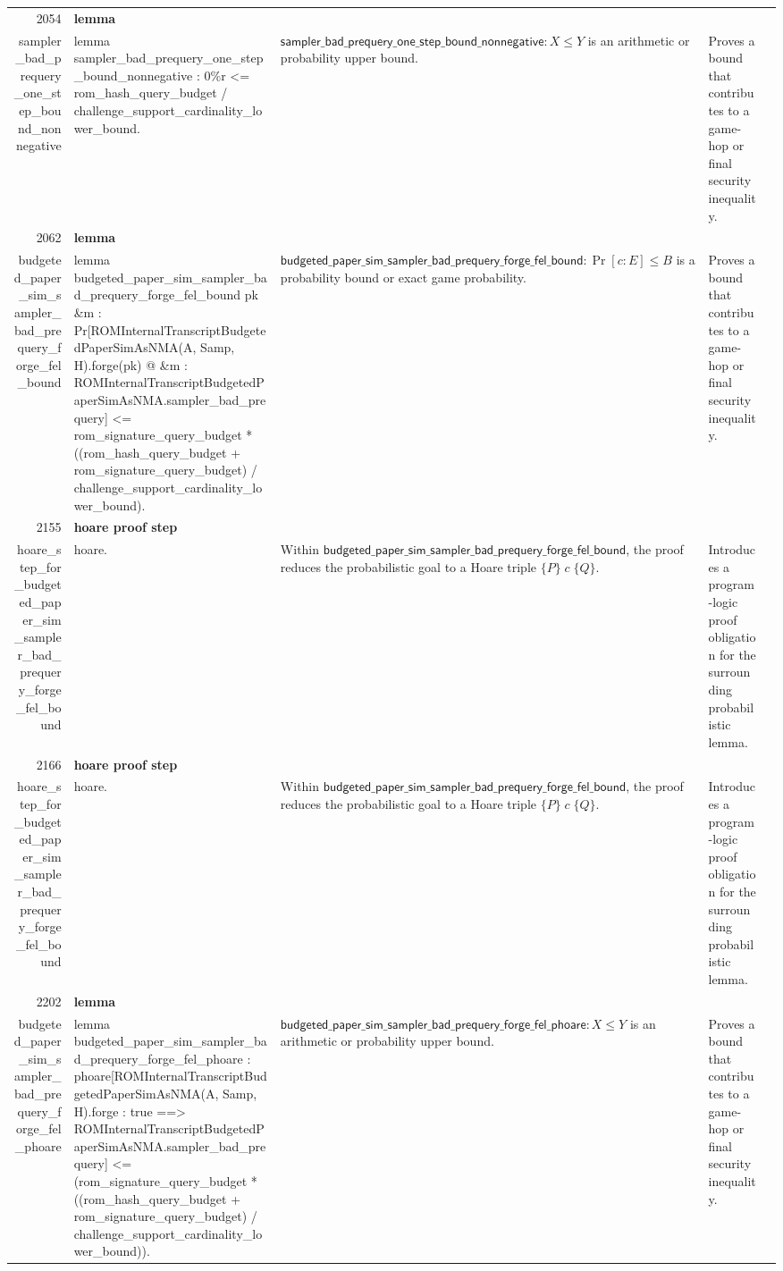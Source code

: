 \documentclass[10pt]{article}
\newcommand{\ec}[1]{\begingroup\ttfamily\scriptsize #1\endgroup}
\begin{document}
\begin{longtable}{r L{0.17\textwidth} L{0.26\textwidth} L{0.27\textwidth} L{0.20\textwidth}}
2054 & \textbf{lemma}\\\ec{sampler\_bad\_prequery\_one\_step\_bound\_nonnegative} & \ec{lemma sampler\_bad\_prequery\_one\_step\_bound\_nonnegative : 0\%r <= rom\_hash\_query\_budget / challenge\_support\_cardinality\_lower\_bound.} & \(\mathsf{sampler\_bad\_prequery\_one\_step\_bound\_nonnegative} : X \le Y\) is an arithmetic or probability upper bound. & Proves a bound that contributes to a game-hop or final security inequality. \\
2062 & \textbf{lemma}\\\ec{budgeted\_paper\_sim\_sampler\_bad\_prequery\_forge\_fel\_bound} & \ec{lemma budgeted\_paper\_sim\_sampler\_bad\_prequery\_forge\_fel\_bound pk \&m : Pr[ROMInternalTranscriptBudgetedPaperSimAsNMA(A, Samp, H).forge(pk) @ \&m : ROMInternalTranscriptBudgetedPaperSimAsNMA.sampler\_bad\_prequery] <= rom\_signature\_query\_budget * ((rom\_hash\_query\_budget + rom\_signature\_query\_budget) / challenge\_support\_cardinality\_lower\_bound).} & \(\mathsf{budgeted\_paper\_sim\_sampler\_bad\_prequery\_forge\_fel\_bound} : \Pr[c : E] \le B\) is a probability bound or exact game probability. & Proves a bound that contributes to a game-hop or final security inequality. \\
2155 & \textbf{hoare proof step}\\\ec{hoare\_step\_for\_budgeted\_paper\_sim\_sampler\_bad\_prequery\_forge\_fel\_bound} & \ec{hoare.} & Within \(\mathsf{budgeted\_paper\_sim\_sampler\_bad\_prequery\_forge\_fel\_bound}\), the proof reduces the probabilistic goal to a Hoare triple \(\{P\}\;c\;\{Q\}\). & Introduces a program-logic proof obligation for the surrounding probabilistic lemma. \\
2166 & \textbf{hoare proof step}\\\ec{hoare\_step\_for\_budgeted\_paper\_sim\_sampler\_bad\_prequery\_forge\_fel\_bound} & \ec{hoare.} & Within \(\mathsf{budgeted\_paper\_sim\_sampler\_bad\_prequery\_forge\_fel\_bound}\), the proof reduces the probabilistic goal to a Hoare triple \(\{P\}\;c\;\{Q\}\). & Introduces a program-logic proof obligation for the surrounding probabilistic lemma. \\
2202 & \textbf{lemma}\\\ec{budgeted\_paper\_sim\_sampler\_bad\_prequery\_forge\_fel\_phoare} & \ec{lemma budgeted\_paper\_sim\_sampler\_bad\_prequery\_forge\_fel\_phoare : phoare[ROMInternalTranscriptBudgetedPaperSimAsNMA(A, Samp, H).forge : true ==> ROMInternalTranscriptBudgetedPaperSimAsNMA.sampler\_bad\_prequery] <= (rom\_signature\_query\_budget * ((rom\_hash\_query\_budget + rom\_signature\_query\_budget) / challenge\_support\_cardinality\_lower\_bound)).} & \(\mathsf{budgeted\_paper\_sim\_sampler\_bad\_prequery\_forge\_fel\_phoare} : X \le Y\) is an arithmetic or probability upper bound. & Proves a bound that contributes to a game-hop or final security inequality. \\

\end{longtable}
\end{document}
